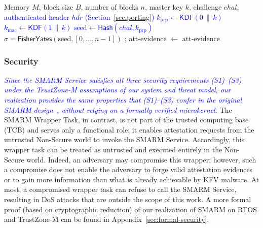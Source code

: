 \documentclass[journal]{IEEEtran}
\newcommand\ben[1]{\textcolor{blue}{#1}}
\begin{document}
\begin{algorithm}[t]
\caption{Pseudocode of SMARM Service.
\ben{The HMAC first absorbs the authenticated header $\mathit{hdr} = (\mathit{sid}, B, n, \mathit{base}, |M|, T, chal)$ and then the blocks in measurement order, so $chal$ is bound both explicitly and through~$\sigma$.
The same applies to Algorithms~\ref{alg:rtsmarm-bitarray} and~\ref{alg:rtsmarm-fpe}.}}

\label{alg:smarm_baseline}
\begin{algorithmic}[1]
\small
\Notation Memory $M$, block size $B$, number of blocks $n$, master key $k$, challenge $chal$\ben{, authenticated header $\mathit{hdr}$ (Section~\ref{sec:porting})}
\State \ben{$k_{\mathrm{prp}} \gets \mathsf{KDF}(0 \,\|\, k)$}
\State \ben{$k_{\mathrm{mac}} \gets \mathsf{KDF}(1 \,\|\, k)$}
\State \ben{$\text{seed} \gets \mathsf{Hash}(chal, k_{\mathrm{prp}})$}
\State $\sigma = \mathsf{FisherYates}(\text{seed}, [0,\ldots,n-1])$
\State \ben{; \Call{HMAC.Update}{hmac, $\mathit{hdr}$}}
    \State {}
    \State {}
    \State {}
\EndFor
\State att-evidence $\gets$ 
\Output att-evidence
\end{algorithmic}
\end{algorithm}



\subsubsection{Security}
\ben{\emph{Since the SMARM Service satisfies all three security requirements (S1)–(S3) under the TrustZone-M assumptions of our system and threat model, our realization provides the same properties that (S1)–(S3) confer in the original SMARM design~\cite{smarm}, without relying on a formally verified microkernel.}}
The SMARM Wrapper Task, in contrast, is not part of the trusted computing base (TCB) and serves only a functional role: it enables attestation requests from the untrusted Non-Secure world to invoke the SMARM Service.
Accordingly, this wrapper task can be treated as untrusted and executed entirely in the Non-Secure world.
Indeed, an adversary may compromise this wrapper; 
however, such a compromise does not enable the adversary to forge valid attestation evidences or to gain more information than what is already achievable by KFV malware.
At most, a compromised wrapper task can refuse to call the SMARM Service, resulting in DoS attacks that are outside the scope of this work.
A more formal proof (based on cryptographic reduction) of our realization of SMARM on RTOS and TrustZone-M can be found in Appendix~\ref{sec:formal-security}.
\end{document}
